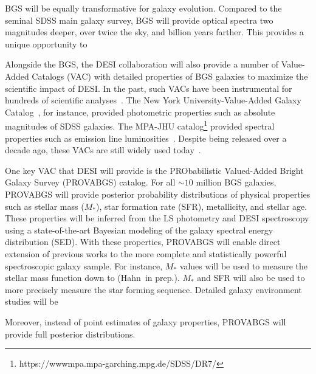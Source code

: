 BGS will be equally transformative for galaxy evolution. 
Compared to the seminal SDSS main galaxy survey, BGS will provide optical
spectra two magnitudes deeper, over twice the sky, and  billion years
farther. 
This provides a unique opportunity to 

Alongside the BGS, the DESI collaboration will also provide a number of
Value-Added Catalogs (VAC) with detailed properties of BGS galaxies to maximize
the scientific impact of DESI. 
In the past, such VACs have been instrumental for hundreds of scientific
analyses~\citep[see][for a review]{blanton2009}. 
The New York University-Value-Added Galaxy
Catalog~\citep[NYU-VAGC][]{blanton2005}, for instance, provided photometric
properties such as absolute magnitudes of SDSS galaxies. 
The MPA-JHU catalog\footnote{https://wwwmpa.mpa-garching.mpg.de/SDSS/DR7/}
provided spectral properties such as emission line
luminosities~\cite{brinchmann2004}.
Despite being released over a decade ago, these VACs are still widely used
today~\citep[\emph{e.g.}][]{alpaslan2021}. 

One key VAC that DESI will provide is the PRObabilistic Valued-Added Bright
Galaxy Survey (PROVABGS) catalog. 
For all ${\sim}10$ million BGS galaxies, PROVABGS will provide posterior
probability distributions of physical properties such as stellar mass ($M_*$),
star formation rate (SFR), metallicity, and stellar age. 
These properties will be inferred from the LS photometry and DESI spectroscopy
using a state-of-the-art Bayesian modeling of the galaxy spectral energy
distribution (SED). 
With these properties, PROVABGS will enable direct extension of previous works
to the more complete and statistically powerful spectroscopic galaxy sample. 
For instance, $M_*$ values will be used to measure the stellar mass function
down to  (Hahn\etal~in prep.). 
$M_*$ and SFR will also be used to more precisely measure the star forming
sequence.
Detailed galaxy environment studies will be 

Moreover, instead of point estimates of galaxy properties, PROVABGS will
provide full posterior distributions. 


